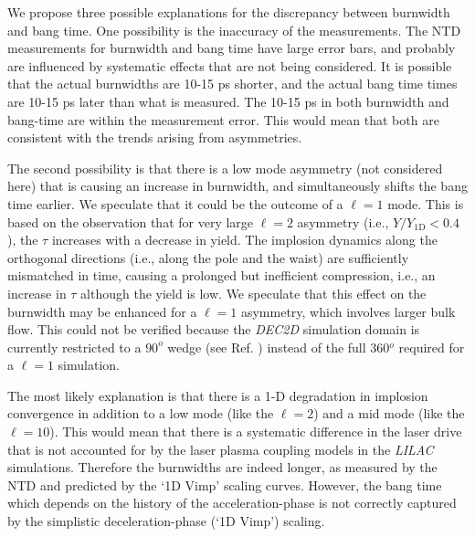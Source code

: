 \documentclass[aip,reprint]{revtex4-1}
\begin{document}
 We propose three possible explanations for the discrepancy between burnwidth and bang time. One possibility is the inaccuracy of the measurements. The NTD measurements for burnwidth and bang time have large error bars, and probably are influenced by systematic effects that are not being considered. It is possible that the actual burnwidths are 10-15 ps shorter, and the actual bang time times are 10-15 ps later than what is measured. The 10-15 ps in both burnwidth and bang-time are within the measurement error. This would mean that both are consistent with the trends arising from asymmetries.

 The second possibility is that there is a low mode asymmetry (not considered here) that is causing an increase in burnwidth, and simultaneously shifts the bang time earlier. We speculate that it could be the outcome of a $\ell=1$ mode. This is based on the observation that for very large $\ell=2$ asymmetry (i.e., $Y/Y_\text{1D}< 0.4$), the $\tau$ increases with a decrease in yield. The implosion dynamics along the orthogonal directions (i.e., along the pole and the waist) are sufficiently mismatched in time, causing a prolonged but inefficient compression, i.e., an increase in $\tau$ although the yield is low. We speculate that this effect on the burnwidth may be enhanced for a $\ell=1$ asymmetry, which involves larger bulk flow. This could not be verified because the \textit{DEC2D} simulation domain is currently restricted to a $90^o$ wedge (see Ref. ) instead of the full 360$^o$ required for a $\ell=1$ simulation.

The most likely explanation is that there is a 1-D degradation in implosion convergence in addition to a low mode (like the $\ell =2$) and a mid mode (like the $\ell =10$). This would mean that there is a systematic difference in the laser drive that is not accounted for by the laser plasma coupling models in the \textit{LILAC} simulations. Therefore the burnwidths are indeed longer, as measured by the NTD and predicted by the `1D Vimp' scaling curves. However, the bang time which depends on the history of the acceleration-phase is not correctly captured by the simplistic deceleration-phase (`1D Vimp') scaling.  

%
%
%
%
%
\end{document}
